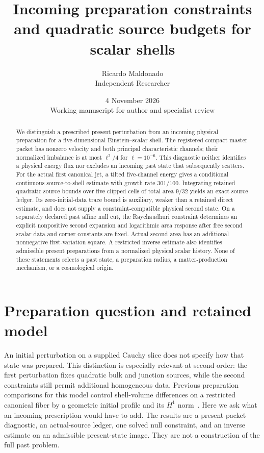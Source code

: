 \documentclass[11pt]{article}
\title{Incoming preparation constraints and quadratic source budgets for scalar shells}
\author{Ricardo Maldonado\\Independent Researcher}
\date{4 November 2026\\[3pt]\small Working manuscript for author and specialist review}
\begin{document}
\maketitle
\begin{abstract}
We distinguish a prescribed present perturbation from an incoming physical
preparation for a five-dimensional Einstein--scalar shell. The registered
compact master packet has nonzero velocity and both principal characteristic
channels; their normalized imbalance is at most $\ell^2/4$ for
$\ell=10^{-6}$. This diagnostic neither identifies a physical energy flux nor
excludes an incoming past state that subsequently scatters.
For the actual first canonical jet, a tilted five-channel energy gives a
conditional continuous source-to-shell estimate with growth rate $301/100$.
Integrating retained quadratic source bounds over five clipped cells of total
area $9/32$ yields an exact source ledger. Its zero-initial-data trace bound
is auxiliary, weaker than a retained direct estimate, and does not supply a
constraint-compatible physical second state.
On a separately declared past affine null cut, the Raychaudhuri constraint
determines an explicit nonpositive second expansion and logarithmic area
response after free second scalar data and corner constants are fixed.
Actual second area has an additional nonnegative first-variation square.
A restricted inverse estimate also identifies admissible present preparations
from a normalized physical scalar history. None of these statements selects
a past state, a preparation radius, a matter-production mechanism, or a
cosmological origin.
\end{abstract}

\section{Preparation question and retained model}
An initial perturbation on a supplied Cauchy slice does not specify how that
state was prepared. This distinction is especially relevant at second order:
the first perturbation fixes quadratic bulk and junction sources, while the
second constraints still permit additional homogeneous data. Previous
preparation comparisons for this model control shell-volume differences on
a restricted canonical fiber by a geometric initial profile and its $H^1$
norm~\cite{geometric,h1}. Here we ask what an incoming prescription would
have to add. The results are a present-packet diagnostic, an actual-source
ledger, one solved null constraint, and an inverse estimate on an admissible
present-state image. They are not a construction of the full past problem.
\end{document}

